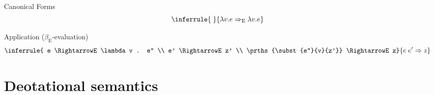 \begin{enumcirc}
	Canonical Forms
	\[
		\inferrule{\;}{\lambda v. e \RightarrowE \lambda v. e}
	\]

	Application ($\beta_\textrm{E}$-evaluation)
	\[
		\inferrule
		{
			e \RightarrowE \lambda v . e'' \\
			e' \RightarrowE z' \\
			\prths{\subst{e''}{v}{z'}} \RightarrowE z}
		{e \; e' \Rightarrow z}
	\]
	\begin{exercise}
		\todo
	\end{exercise}
\end{enumcirc}

\section{Deotational semantics}

